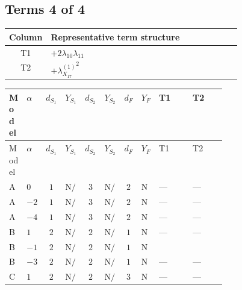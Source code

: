 \documentclass[8pt]{article}
\begin{document}
\begin{landscape}
\subsection*{Terms 4 of 4}
\begin{center}
\begin{tabular}{@{}c >{\raggedright\arraybackslash}p{0.82\linewidth}@{}}
\toprule
Column & Representative term structure \\
\midrule
T1 & \(\displaystyle +2 {\lambda_{10}} {\lambda_{11}}\) \\
\midrule
T2 & \(\displaystyle +{\lambda_{X_{17}}^{(1)}}^2\) \\
\midrule
\bottomrule
\end{tabular}
\end{center}
\smallskip
\tiny
\begin{longtable}{@{}llcccccc >{\raggedright\arraybackslash}p{0.21\linewidth} >{\raggedright\arraybackslash}p{0.21\linewidth}@{}}
\toprule
Model & $\alpha$ & $d_{S_1}$ & $Y_{S_1}$ & $d_{S_2}$ & $Y_{S_2}$ & $d_F$ & $Y_F$ & T1 & T2 \\
\midrule
\endfirsthead
\toprule
Model & $\alpha$ & $d_{S_1}$ & $Y_{S_1}$ & $d_{S_2}$ & $Y_{S_2}$ & $d_F$ & $Y_F$ & T1 & T2 \\
\midrule
\endhead
A & $0$ & $1$ & $\text{N/A}$ & $3$ & $\text{N/A}$ & $2$ & $\text{N/A}$ & --- & --- \\
\midrule
A & $-2$ & $1$ & $\text{N/A}$ & $3$ & $\text{N/A}$ & $2$ & $\text{N/A}$ & --- & --- \\
\midrule
A & $-4$ & $1$ & $\text{N/A}$ & $3$ & $\text{N/A}$ & $2$ & $\text{N/A}$ & --- & --- \\
\midrule
B & $1$ & $2$ & $\text{N/A}$ & $2$ & $\text{N/A}$ & $1$ & $\text{N/A}$ & --- & --- \\
\midrule
B & $-1$ & $2$ & $\text{N/A}$ & $2$ & $\text{N/A}$ & $1$ & $\text{N/A}$ & \scriptsize\adjustbox{max width=\linewidth}{$\begin{gathered} +2 {\lambda_{10}} {\lambda_{11}}\end{gathered}$} & \scriptsize\adjustbox{max width=\linewidth}{$\begin{gathered} +{\lambda_{X_{17}}^{(1)}}^2\end{gathered}$} \\
\midrule
B & $-3$ & $2$ & $\text{N/A}$ & $2$ & $\text{N/A}$ & $1$ & $\text{N/A}$ & --- & --- \\
\midrule
C & $1$ & $2$ & $\text{N/A}$ & $2$ & $\text{N/A}$ & $3$ & $\text{N/A}$ & --- & --- \\

\end{longtable}
\end{landscape}
\end{document}
